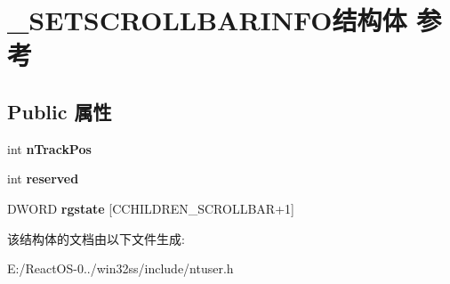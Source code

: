 \hypertarget{struct___s_e_t_s_c_r_o_l_l_b_a_r_i_n_f_o}{}\section{\+\_\+\+S\+E\+T\+S\+C\+R\+O\+L\+L\+B\+A\+R\+I\+N\+F\+O结构体 参考}
\label{struct___s_e_t_s_c_r_o_l_l_b_a_r_i_n_f_o}
\subsection*{Public 属性}
\begin{DoxyCompactItemize}
\item 
\mbox{\label{struct___s_e_t_s_c_r_o_l_l_b_a_r_i_n_f_o_ae1fd29b3bbf1133ec9982953c7b94fc6}} 
int {\bfseries n\+Track\+Pos}
\item 
\mbox{\label{struct___s_e_t_s_c_r_o_l_l_b_a_r_i_n_f_o_a6b6739ff86475c4fea26bee7dc1c2e91}} 
int {\bfseries reserved}
\item 
\mbox{\label{struct___s_e_t_s_c_r_o_l_l_b_a_r_i_n_f_o_ac4d9c6044b6174db572824a3562eeff5}} 
D\+W\+O\+RD {\bfseries rgstate} \mbox{[}C\+C\+H\+I\+L\+D\+R\+E\+N\+\_\+\+S\+C\+R\+O\+L\+L\+B\+AR+1\mbox{]}
\end{DoxyCompactItemize}


该结构体的文档由以下文件生成\+:\begin{DoxyCompactItemize}
\item 
E\+:/\+React\+O\+S-\/0../win32ss/include/ntuser.\+h\end{DoxyCompactItemize}
